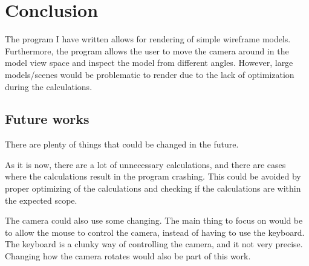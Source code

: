 \section{Conclusion}
\label{05}

The program I have written allows for rendering of simple wireframe models. Furthermore, the program allows the user to move the camera around in the model view space and inspect the model from different angles. However, large models/scenes would be problematic to render due to the lack of optimization during the calculations.

\subsection{Future works}
\label{05_01}
There are plenty of things that could be changed in the future.

As it is now, there are a lot of unnecessary calculations, and there are cases where the calculations result in the program crashing. This could be avoided by proper optimizing of the calculations and checking if the calculations are within the expected scope.

The camera could also use some changing. The main thing to focus on would be to allow the mouse to control the camera, instead of having to use the keyboard. The keyboard is a clunky way of controlling the camera, and it not very precise.  Changing how the camera rotates would also be part of this work.
